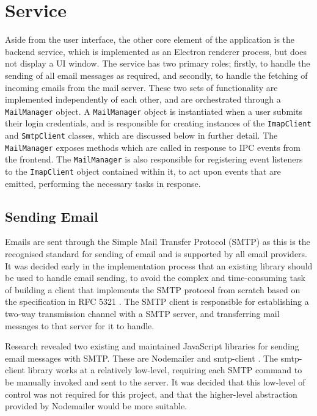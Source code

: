 \section{Service}

Aside from the user interface, the other core element of the application is the backend service, which is implemented as an Electron renderer process, but does not display a UI window. The service has two primary roles; firstly, to handle the sending of all email messages as required, and secondly, to handle the fetching of incoming emails from the mail server. These two sets of functionality are implemented independently of each other, and are orchestrated through a \verb|MailManager| object. A \verb|MailManager| object is instantiated when a user submits their login credentials, and is responsible for creating instances of the \verb|ImapClient| and \verb|SmtpClient| classes, which are discussed below in further detail. The \verb|MailManager| exposes methods which are called in response to IPC events from the frontend. The \verb|MailManager| is also responsible for registering event listeners to the \verb|ImapClient| object contained within it, to act upon events that are emitted, performing the necessary tasks in response.


\subsection{Sending Email}
Emails are sent through the Simple Mail Transfer Protocol (SMTP) \cite{smtp-rfc} as this is the recognised standard for sending of email and is supported by all email providers. It was decided early in the implementation process that an existing library should be used to handle email sending, to avoid the complex and time-consuming task of building a client that implements the SMTP protocol from scratch based on the specification in RFC 5321 \cite{smtp-rfc}. The SMTP client is responsible for establishing a two-way transmission channel with a SMTP server, and transferring mail messages to that server for it to handle.

Research revealed two existing and maintained JavaScript libraries for sending email messages with SMTP. These are Nodemailer \cite{nodemailer} and smtp-client \cite{smtp-client}. The smtp-client library works at a relatively low-level, requiring each SMTP command to be manually invoked and sent to the server. It was decided that this low-level of control was not required for this project, and that the higher-level abstraction provided by Nodemailer would be more suitable.

